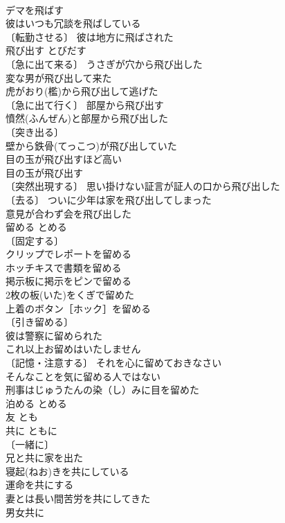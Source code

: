 \documentclass[8pt]{extreport}
\begin{document}
\begin{CJK}{UTF8}{min}
\\	デマを飛ばす 
\\	彼はいつも冗談を飛ばしている 
\\	〔転勤させる〕 彼は地方に飛ばされた 
\\	飛び出す	とびだす	
\\	〔急に出て来る〕 うさぎが穴から飛び出した 
\\	変な男が飛び出して来た 
\\	虎がおり(檻)から飛び出して逃げた 
\\	〔急に出て行く〕 部屋から飛び出す 
\\	憤然(ふんぜん)と部屋から飛び出した 
\\	〔突き出る〕
\\	壁から鉄骨(てっこつ)が飛び出していた 
\\	目の玉が飛び出すほど高い 
\\	目の玉が飛び出す 
\\	〔突然出現する〕 思い掛けない証言が証人の口から飛び出した 
\\	〔去る〕 ついに少年は家を飛び出してしまった 
\\	意見が合わず会を飛び出した 
\\	留める	とめる	
\\	〔固定する〕
\\	クリップでレポートを留める 
\\	ホッチキスで書類を留める 
\\	掲示板に掲示をピンで留める 
\\	2枚の板(いた)をくぎで留めた 
\\	上着のボタン［ホック］を留める 
\\	〔引き留める〕
\\	彼は警察に留められた 
\\	これ以上お留めはいたしません 
\\	〔記憶・注意する〕 それを心に留めておきなさい 
\\	そんなことを気に留める人ではない 
\\	刑事はじゅうたんの染（し）みに目を留めた 
\\	泊める	とめる	
\\	友	とも	
\\	共に	ともに	
\\	〔一緒に〕
\\	兄と共に家を出た 
\\	寝起(ねお)きを共にしている 
\\	運命を共にする 
\\	妻とは長い間苦労を共にしてきた 
\\	男女共に 

\end{CJK}
\end{document}

